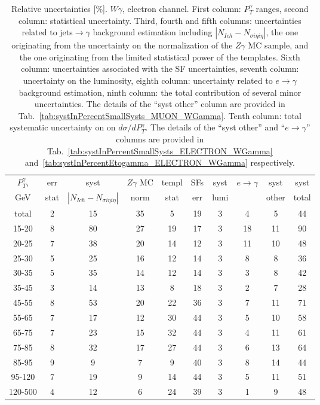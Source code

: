 \begin{table}[h]
  \scriptsize
  \begin{center}
  \caption{Relative uncertainties [\%]. $W\gamma$, electron channel. First column: $P_T^{\gamma}$ ranges, second column: statistical uncertainty. Third, fourth and fifth columns: uncertainties related to jets$\rightarrow\gamma$ background estimation including $|N_{Ich}-N_{\sigma i\eta i\eta}|$, the one originating from the uncertainty on the normalization of the $Z\gamma$ MC sample, and the one originating from the limited statistical power of the templates. Sixth column: uncertainties associated with the SF uncertainties, seventh column: uncertainty on the luminosity, eighth column: uncertainty related to $e\rightarrow\gamma$ background estimation, ninth column: the total contribution of several minor uncertainties. The details of the ``syst other'' column are provided in Tab.~\ref{tab:systInPercentSmallSysts_MUON_WGamma}. Tenth column: total systematic uncertainty on on $d\sigma/dP_T^{\gamma}$. The details of the ``syst other'' and ``$e\rightarrow\gamma$'' columns are provided in Tab.~\ref{tab:systInPercentSmallSysts_ELECTRON_WGamma} and~\ref{tab:systInPercentEtogamma_ELECTRON_WGamma} respectively. }
   \begin{tabular}{|c|c|c|c|c|c|c|c|c|c|}
    $P_T^{\gamma}$,  & err & syst & $Z\gamma$ MC & templ & SFs & syst & $e\rightarrow\gamma$ & syst & syst\\
    GeV  & stat & $|N_{Ich}-N_{\sigma{i\eta i\eta}}|$ & norm & stat & err & lumi &  & other & total\\ \hline
    total  & 2 & 15 & 35 & 5 & 19 & 3 & 4 & 5 & 44 \\ \hline
    15-20 & 8 & 80 & 27 & 19 & 17 & 3 & 18 & 11 & 90 \\ \hline
    20-25 & 7 & 38 & 20 & 14 & 12 & 3 & 11 & 10 & 48 \\ \hline
    25-30 & 5 & 25 & 16 & 12 & 14 & 3 & 8 & 8 & 36 \\ \hline
    30-35 & 5 & 35 & 14 & 12 & 14 & 3 & 3 & 8 & 42 \\ \hline
    35-45 & 3 & 14 & 13 & 8 & 18 & 3 & 2 & 7 & 28 \\ \hline
    45-55 & 8 & 53 & 20 & 22 & 36 & 3 & 7 & 11 & 71 \\ \hline
    55-65 & 7 & 17 & 12 & 30 & 44 & 3 & 5 & 10 & 58 \\ \hline
    65-75 & 7 & 23 & 15 & 32 & 44 & 3 & 4 & 11 & 61 \\ \hline
    75-85 & 8 & 32 & 17 & 27 & 44 & 3 & 6 & 13 & 64 \\ \hline
    85-95 & 9 & 9 & 7 & 9 & 40 & 3 & 8 & 14 & 44 \\ \hline
    95-120 & 7 & 19 & 9 & 14 & 44 & 3 & 5 & 11 & 51 \\ \hline
    120-500 & 4 & 12 & 6 & 24 & 39 & 3 & 1 & 9 & 48 \\ \hline
  \end{tabular}
  \label{tab:systInPercent_ELECTRON_WGamma}
  \end{center}
\end{table}

